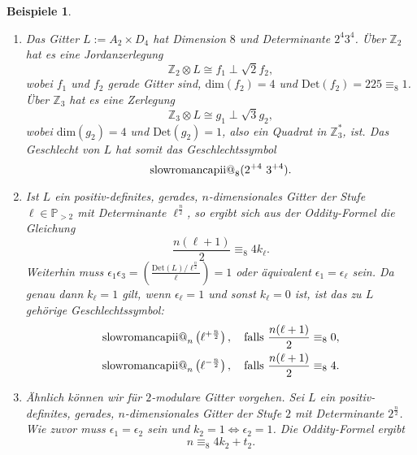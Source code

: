 \documentclass[12pt,a4paper,halfparskip,headsepline,bibtotocnumbered]{scrreprt}
\makeatletter
\theoremstyle{nummermitklammern}
\newtheorem{beispiele}[defsatzusw]{Beispiele}
\theoremstyle{nonumberbreak}
\newcommand{\Z}{\mathbb{Z}}
\renewcommand{\P}{\mathbb{P}}
\newcommand{\Det}{\text{Det}}
\newcommand{\ii}{\text{\expandafter\@slowromancap\romannumeral 2@}}
\makeatother
\begin{document}
\begin{beispiele}
	\begin{enumerate}[label=(\roman*)]
		\item Das Gitter $L := A_2 \times D_4$ hat Dimension $8$ und Determinante $2^4 3^4$. Über $\Z_2$ hat es eine Jordanzerlegung
			\begin{equation*}
				\Z_2 \otimes L \cong f_1 \perp \sqrt{2} f_2,
			\end{equation*}
			wobei $f_1$ und $f_2$ gerade Gitter sind, $\text{dim}(f_2) = 4$ und $\Det(f_2) = 225 \equiv_8 1$. Über $\Z_3$ hat es eine Zerlegung
			\begin{equation*}
				\Z_3 \otimes L \cong g_1 \perp \sqrt{3} g_2,
			\end{equation*}
			wobei $\text{dim}(g_2) = 4$ und $\Det(g_2) = 1$, also ein Quadrat in $\Z_3^\ast$, ist. Das Geschlecht von $L$ hat somit das Geschlechtssymbol
			\begin{equation*}
				\ii_8(2^{+4}\ 3^{+4}).
			\end{equation*}
		\item Ist $L$ ein positiv-definites, gerades, $n$-dimensionales Gitter der Stufe $\ell \in \P_{> 2}$ mit Determinante $\ell^\frac{n}{2}$, so ergibt sich aus der Oddity-Formel die Gleichung
			\begin{equation*}
				\frac{n(\ell+1)}{2} \equiv_8 4 k_\ell.
			\end{equation*}
			Weiterhin muss $\epsilon_1 \epsilon_3 = \left( \frac{\Det(L) / \ell^\frac{n}{2}}{\ell}\right) = 1$ oder äquivalent $\epsilon_1 = \epsilon_\ell$ sein. Da genau dann $k_\ell = 1$ gilt, wenn $\epsilon_\ell = 1$ und sonst $k_\ell = 0$ ist, ist das zu $L$ gehörige Geschlechtssymbol:
			\begin{align*}
				\ii_n\left(\ell^{+\frac{n}{2}}\right), \quad \text{falls } \frac{n(\ell+1)}{2} \equiv_8 0,\\
				\ii_n\left(\ell^{-\frac{n}{2}}\right), \quad \text{falls } \frac{n(\ell+1)}{2} \equiv_8 4.\\
			\end{align*}
		\item Ähnlich können wir für $2$-modulare Gitter vorgehen. Sei $L$ ein positiv-definites, gerades, $n$-dimensionales Gitter der Stufe $2$ mit Determinante $2^\frac{n}{2}$. Wie zuvor muss $\epsilon_1 = \epsilon_2$ sein und $k_2 = 1 \Leftrightarrow \epsilon_2 = 1$. Die Oddity-Formel ergibt
			\begin{equation*}
				n \equiv_8 4 k_2 + t_2.
			\end{equation*}

\end{enumerate}
\end{beispiele}
\end{document}
